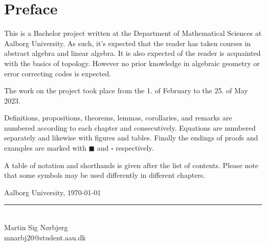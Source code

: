 \chapter{Preface}

This is a Bachelor project written at the Department of Mathematical Sciences at Aalborg University.
As such, it's expected that the reader has taken courses in abstract algebra and linear algebra.
It is also expected of the reader is acquainted with the basics of topology. However no prior knowledge in algebraic geometry or error correcting codes is expected.

The work on the project took place from the 1. of February to the 25. of May 2023.


Definitions, propositions, theorems, lemmas, corollaries, and remarks are numbered according to each chapter and consecutively.
Equations are numbered separately and likewise with figures and tables.
Finally the endings of proofs and examples are marked with $\blacksquare$ and $\square$ respectively.

A table of notation and shorthands is given after the list of contents. 
Please note that some symbols may be used differently in different chapters.

\vspace{\baselineskip}\hfill Aalborg University, \today
\vfill\noindent

\begin{minipage}[H]{\textwidth}
 \centering
 \rule{\textwidth / 2}{1pt}\\
  Martin Sig Nørbjerg\\
 {\footnotesize mnarbj20@student.aau.dk}
\end{minipage}
\hfill
